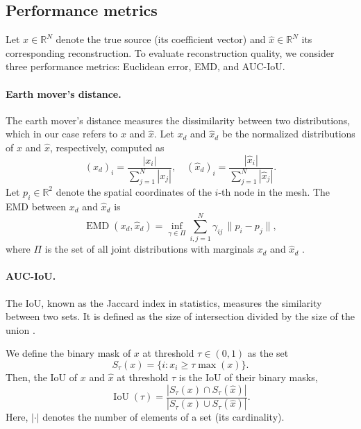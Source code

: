 \subsection{Performance metrics}\label{sec:performance_metrics}
Let $x \in \mathbb{R}^N$ denote the true source (its coefficient vector) and $\hat x \in \mathbb{R}^N$ its corresponding reconstruction. To evaluate reconstruction quality, we consider three performance metrics: Euclidean error, EMD, and AUC-IoU.


\paragraph{Earth mover's distance.} The earth mover's distance measures the dissimilarity between two distributions, which in our case refers to $x$ and $\hat x$. Let $x_d$ and $\hat x_d$ be the normalized distributions of $x$ and $\hat x$, respectively, computed as
\begin{equation*}
    (x_d)_i = \frac{|x_i|}{\sum_{j=1}^N |x_j|}, \quad
    (\hat x_d)_i = \frac{|\hat x_i|}{\sum_{j=1}^N |\hat x_j|}.
\end{equation*}
Let $p_i \in \mathbb{R}^2$ denote the spatial coordinates of the $i$-th node in the mesh. The EMD between $x_d$ and $\hat x_d$ is
\begin{equation*}
    \operatorname{EMD}(x_d, \hat x_d) =
    \inf_{\gamma \in \Pi}
    \sum_{i,j=1}^N \gamma_{ij}\, \| p_i - p_j \|,
\end{equation*}
where $\Pi$ is the set of all joint distributions with marginals $x_d$ and $\hat x_d$ \cite{rubnerMetricDistributionsApplications1998}.


\paragraph{AUC-IoU.} The IoU, known as the Jaccard index in statistics, measures the similarity between two sets. It is defined as the size of intersection divided by the size of the union \cite{raschkaPythonMachineLearning}.

We define the binary mask of $x$ at threshold $\tau \in (0, 1)$ as the set
\begin{equation*}
    S_{\tau}(x) = \{ i : x_i \ge \tau \operatorname{max}(x) \}.
\end{equation*}
Then, the IoU of $x$ and $\hat x$ at threshold $\tau$ is the IoU of their binary masks,
\begin{equation*}
    \operatorname{IoU}(\tau) =
    \frac{|S_\tau(x) \cap S_\tau(\hat x)|}{|S_\tau(x) \cup S_\tau(\hat x)|}.
\end{equation*}
Here, $| \cdot |$ denotes the number of elements of a set (its cardinality).

